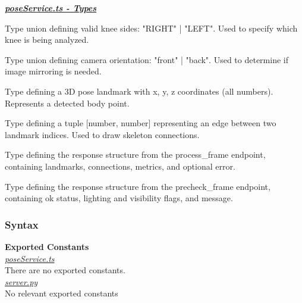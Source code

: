 \documentclass[12pt, titlepage]{article}
\begin{document}
\noindent \textbf{\underline{\textit{poseService.ts - Types}}}\\
\begin{description}[style=nextline, leftmargin=2.5cm]
\item[\texttt{Side}] 
    Type union defining valid knee sides: "RIGHT" | "LEFT". Used to specify which knee is being analyzed.

\item[\texttt{Facing}] 
    Type union defining camera orientation: "front" | "back". Used to determine if image mirroring is needed.

\item[\texttt{Landmark}] 
    Type defining a 3D pose landmark with x, y, z coordinates (all numbers). Represents a detected body point.

\item[\texttt{Connection}] 
    Type defining a tuple [number, number] representing an edge between two landmark indices. Used to draw skeleton connections.

\item[\texttt{ProcessFrameResponse}] 
    Type defining the response structure from the \/process\_frame endpoint, containing landmarks, connections, metrics, and optional error.

\item[\texttt{PrecheckFrameResponse}] 
    Type defining the response structure from the \/precheck\_frame endpoint, containing ok status, lighting and visibility flags, and message.
\end{description}

\subsubsection{Syntax}

\textbf{Exported Constants}\\
\noindent \underline{\textit{poseService.ts}}\\
There are no exported constants.\\
\noindent \underline{\textit{server.py}}\\
No relevant exported constants\\
\end{document}
